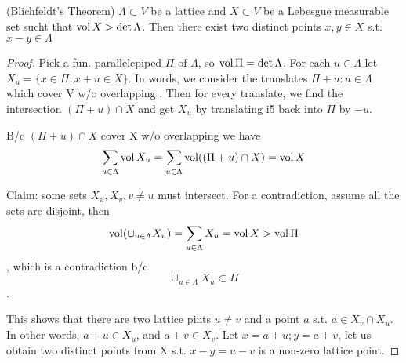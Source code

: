 \begin{theorem}(Blichfeldt's Theorem)
 $\Lambda \subset V$ be a lattice and $X \subset V$ be a Lebesgue measurable set sucht that $\operatorname{vol} X > \det \Lambda$. Then there exist two distinct points $x, y \in X$ s.t. $x - y \in \Lambda$
\end{theorem}
\begin{proof}
	Pick a fun. parallelepiped $\Pi$ of $\Lambda$, so $\operatorname{vol} \Pi = \det \Lambda$. For each $u \in \Lambda$ let $X_u = \{ x \in \Pi : x + u \in X\}$. In words, we consider the translates $\Pi + u : u \in \Lambda$ which cover V w/o overlapping . Then for every translate, we find the intersection $(\Pi + u)\cap X$ and get $X_u$ by translating i5 back into $\Pi$ by $-u$.

B/c $(\Pi+ u) \cap X$ cover X w/o overlapping we have 
\[ \sum_{u \in \Lambda} \operatorname{vol} X_u = \sum_{u \in \Lambda} \operatorname{vol} ( (\Pi + u) \cap X) = \operatorname{vol} X \]

Claim: some sets $X_u, X_v, v \neq u$ must intersect. For a contradiction, assume all the sets are disjoint, then
\[ \operatorname{vol} (\cup_{u \in \Lambda} X_u) = \sum_{u \in \Lambda} X_u = \operatorname{vol} X > \operatorname{vol} \Pi \], which is a contradiction b/c \[ \cup_{u \in \Lambda} X_u \subset \Pi \].

This shows that there are two lattice pints $u \neq v$ and a point $a$ s.t. $a \in X_v \cap X_u$. In other words, $a+u \in X_u$, and $a + v \in X_v$. Let $x = a + u; y = a + v$, let us obtain two distinct points from X s.t. $ x-y=u-v$ is a non-zero lattice point.
\end{proof}



